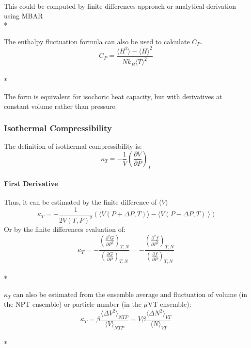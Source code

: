 \documentclass[aps,pre,twocolumn,nofootinbib,superscriptaddress,linenumbers,10pt, draft,tightenlines]{revtex4-1}
\begin{document}
This could be computed by finite differences approach or analytical derivation using MBAR\\*

The enthalpy fluctuation formula can also be used to calculate $C_P$\cite{horn}.
\begin{equation}C_P = \frac{\langle H^2 \rangle - \langle H \rangle^2}{N k_B \langle T \rangle^2}\end{equation}\\*

The form is equivalent for isochoric heat capacity, but with derivatives at constant volume rather than pressure.


\subsubsection{Isothermal Compressibility}
The definition of isothermal compressibility is:
\begin{equation}\kappa_T = -\frac{1}{V} \left(\frac{\partial V}{\partial P}\right)_T \end{equation}
\paragraph{First Derivative}
Thus, it can be estimated by the finite difference of $\langle V \rangle$
\begin{equation}\kappa_T = -\frac{1}{2V(T,P)^2} \left(\langle V(P+\Delta P,T)\rangle - \langle V(P-\Delta P,T)\right\rangle) \end{equation}
Or by the finite differences evaluation of:
\begin{equation}\kappa_T = -\frac{\left(\frac{\partial^2 G}{\partial P^2}\right)_{T, N}}{\left(\frac{\partial G}{\partial P}\right)_{T, N}} = -\frac{\left(\frac{\partial^2 f}{\partial P^2}\right)_{T, N}}{\left(\frac{\partial f}{\partial P}\right)_{T, N}}\end{equation} \\*

$\kappa_T$ can also be estimated from the ensemble average and fluctuation of volume (in the NPT ensemble) or particle number (in the $\mu$VT ensemble)\cite{comp}:
\begin{equation}\kappa_T = \beta \frac{\langle \Delta V^2 \rangle_{NTP}}{\langle V \rangle_{NTP}} = V \beta \frac{\langle \Delta N^2 \rangle_{VT}}{\langle N \rangle_{VT}}\end{equation}\\*
\end{document}
